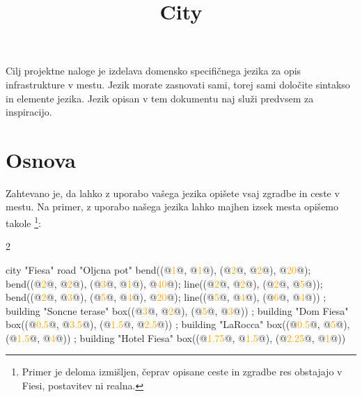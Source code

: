 \documentclass{article}
\title{City}
\newcommand\Num[1]{\textcolor{orange}{#1}}
\begin{document}
Cilj projektne naloge je izdelava domensko specifičnega jezika za opis infrastrukture v mestu.
Jezik morate zasnovati sami, torej sami določite sintakso in elemente jezika.
Jezik opisan v tem dokumentu naj služi predvsem za inspiracijo.

\section{Osnova}
Zahtevano je, da lahko z uporabo vašega jezika opišete vsaj zgradbe in ceste v mestu.
Na primer, z uporabo našega jezika lahko majhen izsek mesta opišemo takole \footnote{Primer je deloma izmišljen, čeprav opisane ceste in zgradbe res obstajajo v Fiesi, postavitev ni realna.}:

\begin{multicols}{2}
\begin{CITY}
  city "Fiesa" {
    road "Oljcna pot" {
      bend((@\Num{1}@, @\Num{1}@), (@\Num{2}@, @\Num{2}@), @\Num{20}@);
      bend((@\Num{2}@, @\Num{2}@), (@\Num{3}@, @\Num{1}@), @\Num{40}@);
      line((@\Num{2}@, @\Num{2}@), (@\Num{2}@, @\Num{5}@));
      bend((@\Num{2}@, @\Num{3}@), (@\Num{5}@, @\Num{4}@), @\Num{20}@);
      line((@\Num{5}@, @\Num{4}@), (@\Num{6}@, @\Num{4}@))
    };
    building "Soncne terase" {
      box((@\Num{3}@, @\Num{2}@), (@\Num{5}@, @\Num{3}@))
    };
    building "Dom Fiesa" {
      box((@\Num{0.5}@, @\Num{3.5}@), (@\Num{1.5}@, @\Num{2.5}@))
    };
    building "LaRocca" {
      box((@\Num{0.5}@, @\Num{5}@), (@\Num{1.5}@, @\Num{4}@))
    };
    building "Hotel Fiesa" {
      box((@\Num{1.75}@, @\Num{1.5}@), (@\Num{2.25}@, @\Num{1}@))
    }
  }
\end{CITY}

\columnbreak

\end{multicols}
\end{document}
